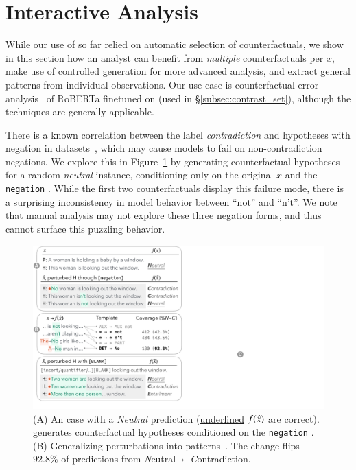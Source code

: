 

\section{Interactive Analysis}
\label{sec:app_err_analysis}

While our use of \sysname so far relied on automatic selection of counterfactuals, we show in this section how an analyst can benefit from \emph{multiple} counterfactuals per $x$, make use of controlled generation for more advanced analysis, and extract general patterns from individual observations.
Our use case is counterfactual error analysis~\cite{wu2019errudite} of RoBERTa finetuned on \nli (used in \S\ref{subsec:contrast_set}), although the techniques are generally applicable.

There is a known correlation between the label \emph{contradiction} and hypotheses with negation in \nli datasets~\cite{gururangan2018annotation}, which may cause models to fail on non-contradiction negations.
We explore this in Figure~\ref{fig:err_analysis} by generating counterfactual hypotheses for a random \emph{neutral} instance, conditioning only on the original $x$ and the \texttt{negation} \tagstr.
While the first two counterfactuals display this failure mode, there is a surprising inconsistency in model behavior between ``not'' and ``n't''.
We note that manual analysis may not explore these three negation forms, and thus cannot surface this puzzling behavior.


\begin{figure}[t]
\centering
\includegraphics[trim={0 12.5cm 33cm 0cm},clip,width=1\columnwidth]{figures/err_analysis.pdf}
\vspace{-15pt}
\caption{
(A) An \nli case with a \emph{Neutral} prediction (\uline{underlined} $f(\hat{x})$ are correct).
\sysname generates counterfactual hypotheses conditioned on the \texttt{negation} \tagstr. 
(B) Generalizing perturbations into patterns~\cite{wu2020tempura}. The change  flips $92.8\%$ of predictions from \emph{N}eutral~$\veryshortarrow$~\emph{C}ontradiction.
}
\vspace{-15pt}
\label{fig:err_analysis}
\end{figure}


